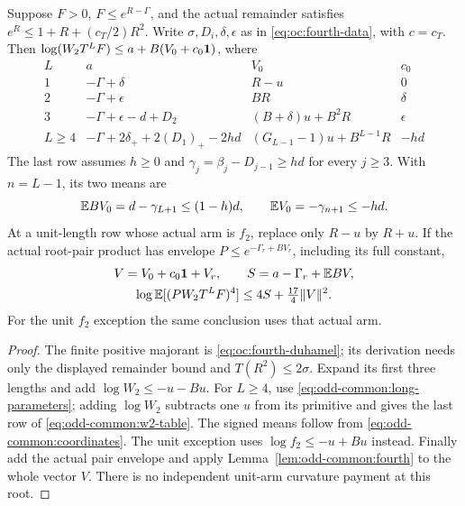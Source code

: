 \begin{lemma}
\label{lem:odd-common:w2}
Suppose \(F>0\), \(F\le e^{R-\Gamma}\), and the actual remainder
satisfies \(e^R\le1+R+(c_T/2)R^2\).
Write \(\sigma,D_i,\delta,\epsilon\) as in
\eqref{eq:oc:fourth-data}, with \(c=c_T\).
Then \(\log(W_2T^LF)\le a+B(V_0+c_0\mathbf1)\), where
\begin{equation}\label{eq:odd-common:w2-table}
\begin{array}{c|c|c|c}
 L&a&V_0&c_0\\ \hline
 1&-\Gamma+\delta&R-u&0\\
 2&-\Gamma+\epsilon&BR&\delta\\
 3&-\Gamma+\epsilon-d+D_2&(B+\delta)u+B^2R&\epsilon\\
 L\ge4&-\Gamma+2\delta_++2(D_1)_+-2hd
          &(G_{L-1}-1)u+B^{L-1}R&-hd
\end{array}
\end{equation}
The last row assumes \(h\ge0\) and
\(\gamma_j=\beta_j-D_{j-1}\ge hd\) for every \(j\ge3\).
With \(n=L-1\), its two means are
\begin{equation}\label{eq:odd-common:w2-long-means}
 \mathbb E BV_0=d-\gamma_{L+1}\le(1-h)d,
 \qquad \mathbb E V_0=-\gamma_{n+1}\le-hd.
\end{equation}
At a unit-length row whose actual arm is \(f_2\), replace only
\(R-u\) by \(R+u\).
If the actual root-pair product has envelope
\(P\le e^{-\Gamma_r+BV_r}\), including its full constant,
\begin{equation}\label{eq:odd-common:w2-complete}
\begin{gathered}
 V=V_0+c_0\mathbf1+V_r,\qquad S=a-\Gamma_r+\mathbb E BV,\\
 \log\mathbb E[(PW_2T^LF)^4]\le4S+\tfrac{17}{4}\|V\|^2.
\end{gathered}
\end{equation}
For the unit \(f_2\) exception the same conclusion uses that actual arm.
\end{lemma}
\begin{proof}
The finite positive majorant is \eqref{eq:oc:fourth-duhamel}; its
derivation needs only the displayed remainder bound and
\(T(R^2)\le2\sigma\).
Expand its first three lengths and add \(\log W_2\le-u-Bu\).
For \(L\ge4\), use \eqref{eq:odd-common:long-parameters}; adding
\(\log W_2\) subtracts one \(u\) from its primitive and gives
the last row of \eqref{eq:odd-common:w2-table}.
The signed means follow from \eqref{eq:odd-common:coordinates}.
The unit exception uses \(\log f_2\le-u+Bu\) instead.
Finally add the actual pair envelope and apply
Lemma~\ref{lem:odd-common:fourth} to the whole vector \(V\).
There is no independent unit-arm curvature payment at this root.
\end{proof}
